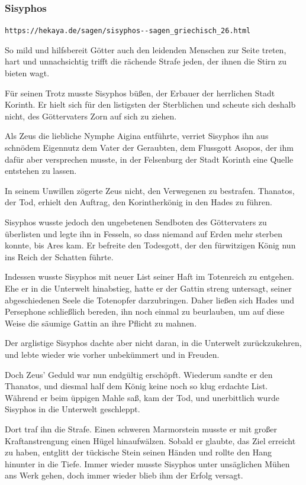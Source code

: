 \documentclass[10pt,a4paper]{article}
\begin{document}
\subsubsection{Sisyphos}

\verb+https://hekaya.de/sagen/sisyphos--sagen_griechisch_26.html+

\vskip 4pt
So mild und hilfsbereit Götter auch den leidenden Menschen zur Seite treten,
hart und unnachsichtig trifft die rächende Strafe jeden, der ihnen die Stirn
zu bieten wagt.

\vskip 4pt
Für seinen Trotz musste Sisyphos büßen, der Erbauer der herrlichen Stadt
Korinth. Er hielt sich für den listigsten der Sterblichen und scheute sich
deshalb nicht, des Göttervaters Zorn auf sich zu ziehen.

\vskip 4pt
Als Zeus die liebliche Nymphe Aigina entführte, verriet Sisyphos ihn aus
schnödem Eigennutz dem Vater der Geraubten, dem Flussgott Asopos, der ihm dafür
aber versprechen musste, in der Felsenburg der Stadt Korinth eine Quelle
entstehen zu lassen.

\vskip 4pt
In seinem Unwillen zögerte Zeus nicht, den Verwegenen zu bestrafen. Thanatos,
der Tod, erhielt den Auftrag, den Korintherkönig in den Hades zu führen.

\vskip 4pt
Sisyphos wusste jedoch den ungebetenen Sendboten des Göttervaters zu überlisten
und legte ihn in Fesseln, so dass niemand auf Erden mehr sterben konnte, bis
Ares kam. Er befreite den Todesgott, der den fürwitzigen König nun ins Reich der
Schatten führte.

\vskip 4pt
Indessen wusste Sisyphos mit neuer List seiner Haft im Totenreich zu entgehen.
Ehe er in die Unterwelt hinabstieg, hatte er der Gattin streng untersagt, seiner
abgeschiedenen Seele die Totenopfer darzubringen. Daher ließen sich Hades und
Persephone schließlich bereden, ihn noch einmal zu beurlauben, um auf diese
Weise die säumige Gattin an ihre Pflicht zu mahnen.

\vskip 4pt
Der arglistige Sisyphos dachte aber nicht daran, in die Unterwelt
zurückzukehren, und lebte wieder wie vorher unbekümmert und in Freuden.

\vskip 4pt
Doch Zeus' Geduld war nun endgültig erschöpft. Wiederum sandte er den Thanatos,
und diesmal half dem König keine noch so klug erdachte List. Während er beim
üppigen Mahle saß, kam der Tod, und unerbittlich wurde Sisyphos in die Unterwelt
geschleppt.

\vskip 4pt
Dort traf ihn die Strafe. Einen schweren Marmorstein musste er mit großer
Kraftanstrengung einen Hügel hinaufwälzen. Sobald er glaubte, das Ziel erreicht
zu haben, entglitt der tückische Stein seinen Händen und rollte den Hang
hinunter in die Tiefe. Immer wieder musste Sisyphos unter unsäglichen Mühen ans
Werk gehen, doch immer wieder blieb ihm der Erfolg versagt.
\end{document}
